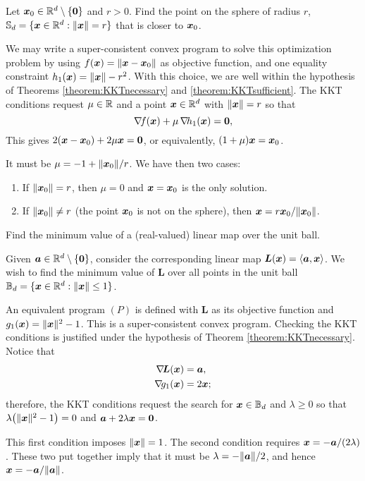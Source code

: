 \begin{example}
Let $\boldsymbol{x}_0 \in \mathbb{R}^d\setminus\{\boldsymbol{0}\}$ and $r>0$.  Find the point on the sphere of radius $r$, $\mathbb{S}_d=\{ \boldsymbol{x} \in \mathbb{R}^d: \lVert \boldsymbol{x} \rVert=r \}$ that is closer to $\boldsymbol{x}_0$. 

We may write a super-consistent convex program to solve this optimization problem by using $f(\boldsymbol{x})=\lVert \boldsymbol{x}-\boldsymbol{x}_0 \rVert$ as objective function, and one equality constraint $h_1(\boldsymbol{x})=\lVert \boldsymbol{x} \rVert-r^2$.  With this choice, we are well within the hypothesis of Theorems \ref{theorem:KKTnecessary} and \ref{theorem:KKTsufficient}.  The KKT conditions request $\mu \in \mathbb{R}$ and a point $\boldsymbol{x} \in \mathbb{R}^d$ with $\lVert \boldsymbol{x} \rVert = r$ so that
\begin{equation*} 
\mathop{\nabla\! {f}}(\boldsymbol{x}) + \mu\mathop{\nabla\! {h_1}}(\boldsymbol{x}) = \boldsymbol{0},
\end{equation*}
This gives $2(\boldsymbol{x}-\boldsymbol{x}_0)+2\mu\boldsymbol{x} = \boldsymbol{0}$, or equivalently, $(1+\mu)\boldsymbol{x} = \boldsymbol{x}_0$.

It must be $\mu = -1+\lVert \boldsymbol{x}_0 \rVert/r$.  We have then two cases:
\begin{enumerate}
	\item If $\lVert \boldsymbol{x}_0 \rVert=r$, then $\mu=0$ and $\boldsymbol{x}=\boldsymbol{x}_0$ is the only solution.
	\item If $\lVert \boldsymbol{x}_0 \rVert \neq r$ (the point $\boldsymbol{x}_0$ is not on the sphere), then $\boldsymbol{x} = r\boldsymbol{x}_0/\lVert \boldsymbol{x}_0 \rVert$.
\end{enumerate}
\end{example}

\begin{example}
Find the minimum value of a (real-valued) linear map over the unit ball.

Given $\boldsymbol{a} \in \mathbb{R}^d\setminus\{ \boldsymbol{0}\}$, consider the corresponding linear map $\boldsymbol{L}(\boldsymbol{x}) = \langle \boldsymbol{a}, \boldsymbol{x} \rangle$.  We wish to find the minimum value of $\boldsymbol{L}$ over all points in the unit ball $\mathbb{B}_d = \{ \boldsymbol{x} \in \mathbb{R}^d : \lVert \boldsymbol{x} \rVert \leq 1 \}$.

An equivalent program $(P)$ is defined with $\boldsymbol{L}$ as its objective function and $g_1(\boldsymbol{x}) = \lVert \boldsymbol{x} \rVert^2-1$. This is a super-consistent convex program.  Checking the KKT conditions is justified under the hypothesis of Theorem \ref{theorem:KKTnecessary}. Notice that
\begin{align*}
\mathop{\nabla\! {\boldsymbol{L}}}(\boldsymbol{x}) &= \boldsymbol{a}, \\
\mathop{\nabla\! {g_1}}(\boldsymbol{x}) &= 2\boldsymbol{x};
\end{align*}
therefore, the KKT conditions request the search for $\boldsymbol{x} \in \mathbb{B}_d$ and $\lambda \geq 0$ so that $\lambda \big( \lVert \boldsymbol{x} \rVert^2-1 \big)=0$ and $\boldsymbol{a}+2\lambda\boldsymbol{x}=\boldsymbol{0}$.

This first condition imposes $\lVert \boldsymbol{x} \rVert=1$.  The second condition requires $\boldsymbol{x} = -\boldsymbol{a}/(2\lambda)$.  These two put together imply that it must be $\lambda = -\lVert \boldsymbol{a} \rVert/2$, and hence $\boldsymbol{x} = -\boldsymbol{a}/\lVert \boldsymbol{a} \rVert$.
\end{example}